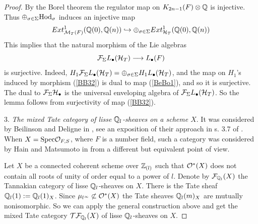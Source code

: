 \documentclass[10pt]{article}
\begin{document}
\begin{proof} 
By the Borel theorem \cite{Bo} 
the regulator map on $K_{2n-1}(F)\otimes {\mathbb Q}$ is injective. Thus 
$\oplus_{\sigma \in \Sigma} {\rm Hod}_{\sigma}$ induces an injective map 
\begin{equation} \label{BeBo1}
  Ext_{{\cal M}_T(F)}^1({\mathbb Q}(0), 
{\mathbb Q}(n))  \hookrightarrow \oplus_{\sigma \in \Sigma} 
Ext_{{\cal H}_T}^1({\mathbb Q}(0), {\mathbb Q}(n))
\end{equation}
This implies that the natural morphism of the Lie algebras
\begin{equation} \label{BB32}
{\cal F}_{\Sigma} L_{\bullet }({\cal H}_T) \longrightarrow L_{\bullet}(F)
\end{equation}
is surjective. Indeed, 
$
H_1{\cal F}_{\Sigma}  L_{\bullet }({\cal H}_T) = \oplus_{\sigma \in \Sigma} H_1L_{\bullet }({\cal H}_T)
$, and  
the map on $H_1$'s induced by morphism (\ref{BB32}) is dual to  map 
(\ref{BeBo1}), and so it is surjective. 
The dual to  ${\cal F}_{\Sigma}{\cal H}_{\bullet }$ is the universal 
enveloping algebra of ${\cal F}_{\Sigma}L_{\bullet}({\cal H}_{T})$. 
So the lemma follows from surjectivity 
of map (\ref{BB32}). 




3. {\it The mixed Tate category of lisse ${\mathbb Q}_l$-sheaves on a scheme $X$}. 
It was considered by Beilinson and Deligne in \cite{BD2},  see an exposition of their approach 
in  s. 3.7 of \cite{G4}. 
When $X={\rm Spec} {\cal O}_{F,S}$, where $F$ is a number field,  such a category 
was considered by Hain and Matsumoto in \cite{HM} from a different but equivalent point of view.

Let $X$ be a connected coherent scheme over ${\mathbb Z}_{(l)}$ such that ${\cal O}^*(X)$ does not 
contain  all roots of unity of order equal to a power of $l$. Denote by 
${\cal F}_{{\mathbb Q}_l}(X)$ the Tannakian category of 
lisse ${\mathbb Q}_l$-sheaves on $X$.   
There is  the Tate sheaf ${\mathbb Q}_l(1):= {\mathbb Q}_l(1)_X$. 
Since $\mu_{l^{\infty}} \not \subset {\cal O}^*(X)$ the Tate sheaves ${\mathbb Q}_l(m)_X$ 
 are mutually nonisomorphic. So we can 
apply the general 
construction above and get the mixed Tate category ${\cal T}{\cal F}_{{\mathbb Q}_l}(X)$ 
of lisse ${\mathbb Q}_l$-sheaves on  $X$. 



\end{proof}
\end{document}
